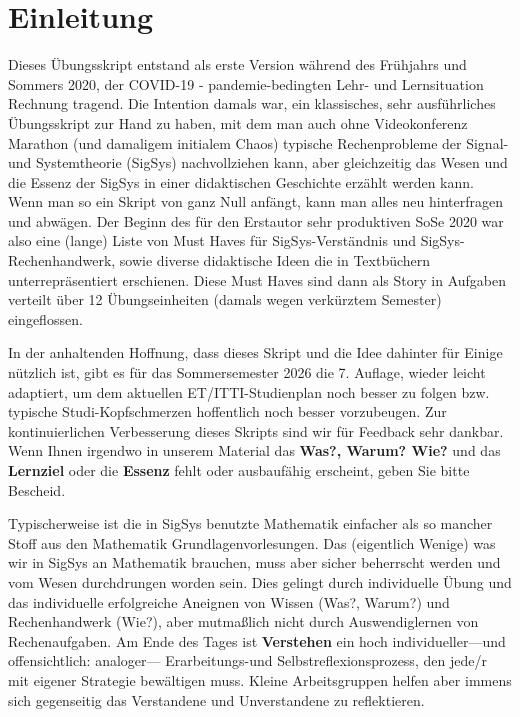 \newpage
\section*{Einleitung}
%

Dieses Übungsskript entstand als erste Version während des Frühjahrs und Sommers 2020, der
COVID-19 - pandemie-bedingten Lehr- und Lernsituation Rechnung tragend.
%
Die Intention damals war, ein klassisches, sehr ausführliches Übungsskript zur Hand zu haben,
mit dem man auch ohne Videokonferenz Marathon (und damaligem initialem Chaos)
typische Rechenprobleme der Signal- und Systemtheorie (SigSys) nachvollziehen kann, aber gleichzeitig das Wesen und die Essenz der SigSys in einer didaktischen Geschichte erzählt werden kann.
%
Wenn man so ein Skript von ganz Null anfängt, kann man alles neu hinterfragen und abwägen. Der Beginn des für den Erstautor sehr produktiven SoSe 2020 war also eine (lange) Liste von Must Haves für SigSys-Verständnis und SigSys-Rechenhandwerk, sowie diverse didaktische Ideen die in Textbüchern unterrepräsentiert erschienen. Diese Must Haves sind dann als Story in Aufgaben verteilt über 12 Übungseinheiten (damals wegen verkürztem Semester) eingeflossen.

In der anhaltenden Hoffnung, dass dieses Skript und die Idee dahinter für Einige nützlich ist, gibt es für das Sommersemester 2026 die 7. Auflage, wieder leicht adaptiert,
um dem aktuellen ET/ITTI-Studienplan noch besser zu folgen bzw. typische Studi-Kopfschmerzen
hoffentlich noch besser vorzubeugen.
%
Zur kontinuierlichen Verbesserung dieses Skripts sind wir für Feedback sehr dankbar.
%
Wenn Ihnen irgendwo in unserem Material das \textbf{Was?, Warum? Wie?} und das
\textbf{Lernziel} oder die \textbf{Essenz} fehlt oder ausbaufähig erscheint, geben Sie bitte Bescheid.

Typischerweise ist die in SigSys benutzte Mathematik einfacher als so mancher
Stoff aus den Mathematik Grundlagenvorlesungen.
%
Das (eigentlich Wenige) was wir in SigSys an Mathematik brauchen, muss aber sicher beherrscht werden
und vom Wesen durchdrungen worden sein.
%
Dies gelingt durch individuelle Übung und das individuelle erfolgreiche Aneignen
von Wissen (Was?, Warum?) und Rechenhandwerk (Wie?), aber mutmaßlich nicht durch
Auswendiglernen von Rechenaufgaben.
%
Am Ende des Tages ist \textbf{Verstehen} ein hoch individueller---und offensichtlich: analoger---
Erarbeitungs-und Selbstreflexionsprozess, den jede/r mit eigener Strategie bewältigen muss.
%
Kleine Arbeitsgruppen helfen aber immens sich gegenseitig das Verstandene und
Unverstandene zu reflektieren.


